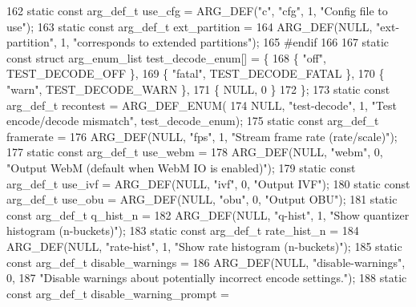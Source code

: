 \begin{DoxyCodeInclude}
{{162 \textcolor{keyword}{static} \textcolor{keyword}{const} arg\_def\_t use\_cfg = ARG\_DEF(\textcolor{stringliteral}{"c"}, \textcolor{stringliteral}{"cfg"}, 1, \textcolor{stringliteral}{"Config file to use"});
163 \textcolor{keyword}{static} \textcolor{keyword}{const} arg\_def\_t ext\_partition =
164     ARG\_DEF(NULL, \textcolor{stringliteral}{"ext-partition"}, 1, \textcolor{stringliteral}{"corresponds to extended partitions"});
165 \textcolor{preprocessor}{#endif}
166 
167 \textcolor{keyword}{static} \textcolor{keyword}{const} \textcolor{keyword}{struct }arg\_enum\_list test\_decode\_enum[] = \{
168   \{ \textcolor{stringliteral}{"off"}, TEST\_DECODE\_OFF \},
169   \{ \textcolor{stringliteral}{"fatal"}, TEST\_DECODE\_FATAL \},
170   \{ \textcolor{stringliteral}{"warn"}, TEST\_DECODE\_WARN \},
171   \{ NULL, 0 \}
172 \};
173 \textcolor{keyword}{static} \textcolor{keyword}{const} arg\_def\_t recontest = ARG\_DEF\_ENUM(
174     NULL, \textcolor{stringliteral}{"test-decode"}, 1, \textcolor{stringliteral}{"Test encode/decode mismatch"}, test\_decode\_enum);
175 \textcolor{keyword}{static} \textcolor{keyword}{const} arg\_def\_t framerate =
176     ARG\_DEF(NULL, \textcolor{stringliteral}{"fps"}, 1, \textcolor{stringliteral}{"Stream frame rate (rate/scale)"});
177 \textcolor{keyword}{static} \textcolor{keyword}{const} arg\_def\_t use\_webm =
178     ARG\_DEF(NULL, \textcolor{stringliteral}{"webm"}, 0, \textcolor{stringliteral}{"Output WebM (default when WebM IO is enabled)"});
179 \textcolor{keyword}{static} \textcolor{keyword}{const} arg\_def\_t use\_ivf = ARG\_DEF(NULL, \textcolor{stringliteral}{"ivf"}, 0, \textcolor{stringliteral}{"Output IVF"});
180 \textcolor{keyword}{static} \textcolor{keyword}{const} arg\_def\_t use\_obu = ARG\_DEF(NULL, \textcolor{stringliteral}{"obu"}, 0, \textcolor{stringliteral}{"Output OBU"});
181 \textcolor{keyword}{static} \textcolor{keyword}{const} arg\_def\_t q\_hist\_n =
182     ARG\_DEF(NULL, \textcolor{stringliteral}{"q-hist"}, 1, \textcolor{stringliteral}{"Show quantizer histogram (n-buckets)"});
183 \textcolor{keyword}{static} \textcolor{keyword}{const} arg\_def\_t rate\_hist\_n =
184     ARG\_DEF(NULL, \textcolor{stringliteral}{"rate-hist"}, 1, \textcolor{stringliteral}{"Show rate histogram (n-buckets)"});
185 \textcolor{keyword}{static} \textcolor{keyword}{const} arg\_def\_t disable\_warnings =
186     ARG\_DEF(NULL, \textcolor{stringliteral}{"disable-warnings"}, 0,
187             \textcolor{stringliteral}{"Disable warnings about potentially incorrect encode settings."});
188 \textcolor{keyword}{static} \textcolor{keyword}{const} arg\_def\_t disable\_warning\_prompt =
}}
\end{DoxyCodeInclude}
